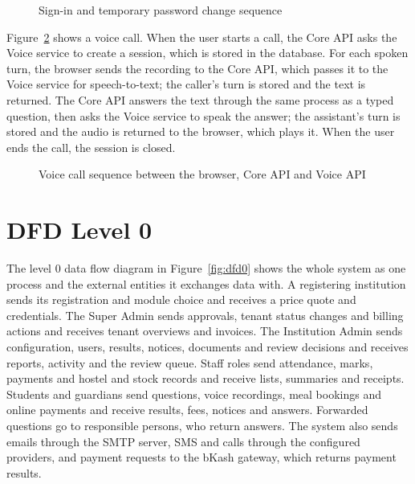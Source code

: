 {
  \begin{figure}[!htbp]
    \centering
    \caption{Sign-in and temporary password change sequence}
    \label{fig:login}
  \end{figure}
}

Figure~\ref{fig:voice} shows a voice call. When the user starts a call, the Core API asks the Voice service to create a session, which is stored in the database. For each spoken turn, the browser sends the recording to the Core API, which passes it to the Voice service for speech-to-text; the caller's turn is stored and the text is returned. The Core API answers the text through the same process as a typed question, then asks the Voice service to speak the answer; the assistant's turn is stored and the audio is returned to the browser, which plays it. When the user ends the call, the session is closed.

{
  \begin{figure}[!htbp]
    \centering
    \caption{Voice call sequence between the browser, Core API and Voice API}
    \label{fig:voice}
  \end{figure}
}

\section{DFD Level 0}
The level 0 data flow diagram in Figure~\ref{fig:dfd0} shows the whole system as one process and the external entities it exchanges data with. A registering institution sends its registration and module choice and receives a price quote and credentials. The Super Admin sends approvals, tenant status changes and billing actions and receives tenant overviews and invoices. The Institution Admin sends configuration, users, results, notices, documents and review decisions and receives reports, activity and the review queue. Staff roles send attendance, marks, payments and hostel and stock records and receive lists, summaries and receipts. Students and guardians send questions, voice recordings, meal bookings and online payments and receive results, fees, notices and answers. Forwarded questions go to responsible persons, who return answers. The system also sends emails through the SMTP server, SMS and calls through the configured providers, and payment requests to the bKash gateway, which returns payment results.

